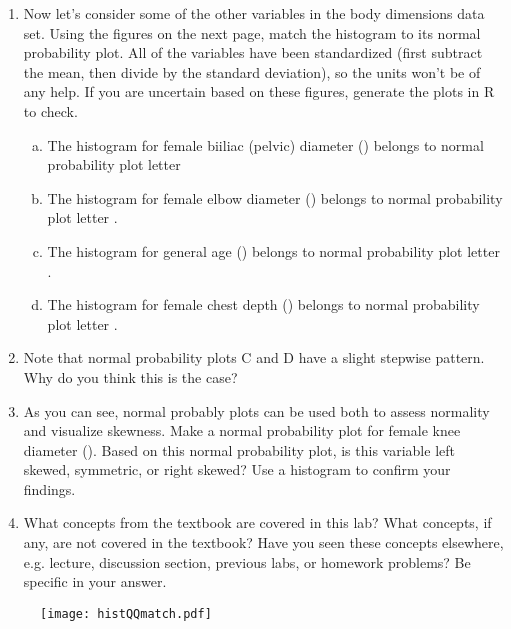 \documentclass[11pt]{article}
\begin{document}
\begin{enumerate}

\item Now let's consider some of the other variables in the body dimensions data set.  Using the figures on the next page, match the histogram to its normal probability plot.  All of the variables have been standardized (first subtract the mean, then divide by the standard deviation), so the units won't be of any help.  If you are uncertain based on these figures, generate the plots in R to check.

\begin{enumerate}[(a)]

\item The histogram for female biiliac (pelvic) diameter (\texttt{}) belongs to normal probability plot letter \underline{\makebox[.25in][l]{}}

\item The histogram for female elbow diameter (\texttt{}) belongs to normal probability plot letter \underline{\makebox[.25in][l]{}}.

\item The histogram for general age (\texttt{}) belongs to normal probability plot letter \underline{\makebox[.25in][l]{}}.

\item The histogram for female chest depth (\texttt{}) belongs to normal probability plot letter \underline{\makebox[.25in][l]{}}.
\end{enumerate}

\item Note that normal probability plots C and D have a slight stepwise pattern.  Why do you think this is the case?

\item As you can see, normal probably plots can be used both to assess normality and visualize skewness.  Make a normal probability plot for female knee diameter (\texttt{}).  Based on this normal probability plot, is this variable left skewed, symmetric, or right skewed?  Use a histogram to confirm your findings.

\item What concepts from the textbook are covered in this lab?  What concepts, if any, are not covered in the textbook?  Have you seen these concepts elsewhere, e.g. lecture, discussion section, previous labs, or homework problems?  Be specific in your answer.

\end{enumerate}

\newpage

\begin{figure}[h]
   \centering
	\texttt{[image: histQQmatch.pdf]}
\end{figure}
\end{document}
